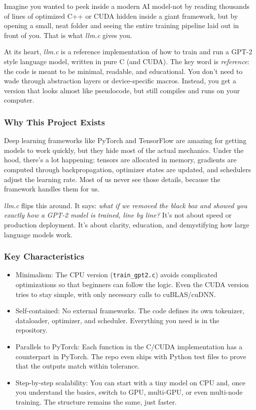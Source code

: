 \documentclass[
  letterpaper,
  DIV=11,
  numbers=noendperiod]{scrreprt}
\providecommand{\tightlist}{%
  \setlength{\itemsep}{0pt}\setlength{\parskip}{0pt}}
\begin{document}
Imagine you wanted to peek inside a modern AI model-not by reading
thousands of lines of optimized C++ or CUDA hidden inside a giant
framework, but by opening a small, neat folder and seeing the entire
training pipeline laid out in front of you. That is what \emph{llm.c}
gives you.

At its heart, \emph{llm.c} is a reference implementation of how to train
and run a GPT-2 style language model, written in pure C (and CUDA). The
key word is \emph{reference}: the code is meant to be minimal, readable,
and educational. You don't need to wade through abstraction layers or
device-specific macros. Instead, you get a version that looks almost
like pseudocode, but still compiles and runs on your computer.

\subsubsection{Why This Project Exists}\label{why-this-project-exists}

Deep learning frameworks like PyTorch and TensorFlow are amazing for
getting models to work quickly, but they hide most of the actual
mechanics. Under the hood, there's a lot happening: tensors are
allocated in memory, gradients are computed through backpropagation,
optimizer states are updated, and schedulers adjust the learning rate.
Most of us never see those details, because the framework handles them
for us.

\emph{llm.c} flips this around. It says: \emph{what if we removed the
black box and showed you exactly how a GPT-2 model is trained, line by
line?} It's not about speed or production deployment. It's about
clarity, education, and demystifying how large language models work.

\subsubsection{Key Characteristics}\label{key-characteristics}

\begin{itemize}
\tightlist
\item
  Minimalism: The CPU version (\texttt{train\_gpt2.c}) avoids
  complicated optimizations so that beginners can follow the logic. Even
  the CUDA version tries to stay simple, with only necessary calls to
  cuBLAS/cuDNN.
\item
  Self-contained: No external frameworks. The code defines its own
  tokenizer, dataloader, optimizer, and scheduler. Everything you need
  is in the repository.
\item
  Parallels to PyTorch: Each function in the C/CUDA implementation has a
  counterpart in PyTorch. The repo even ships with Python test files to
  prove that the outputs match within tolerance.
\item
  Step-by-step scalability: You can start with a tiny model on CPU and,
  once you understand the basics, switch to GPU, multi-GPU, or even
  multi-node training. The structure remains the same, just faster.
\end{itemize}
\end{document}
